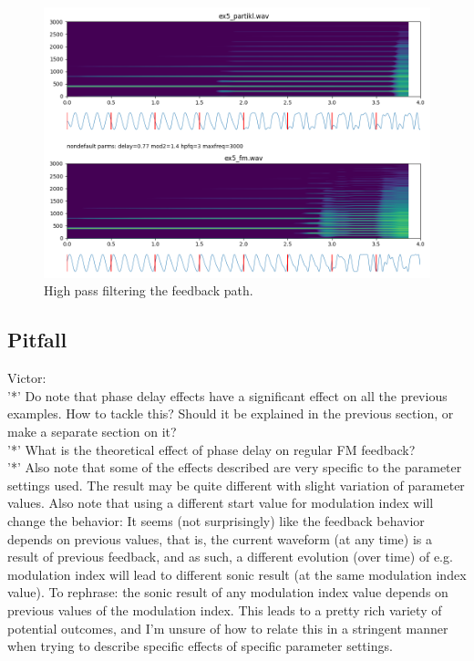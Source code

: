 \documentclass[runningheads,a4paper]{llncs}
\begin{document}
\begin{figure}
	\centering
	\includegraphics[width=.95\textwidth]{ex5_compare.png}
	\caption{High pass filtering the feedback path.}
	\label{fig:ex5}
\end{figure}

\subsection{Pitfall}
Victor: \\
'*' Do note that phase delay effects have a significant effect on all the previous examples. How to tackle this? Should it be explained in the previous section, or make a separate section on it? \\
'*' What is the theoretical effect of phase delay on regular FM feedback? \\
'*' Also note that some of the effects described are very specific to the parameter settings used. The result may be quite different with slight variation of parameter values. Also note that using a different start value for modulation index will change the behavior: It seems (not surprisingly) like the feedback behavior depends on previous values, that is, the current waveform (at any time) is a result of previous feedback, and as such, a different evolution (over time) of e.g. modulation index will lead to different sonic result (at the same modulation index value). To rephrase: the sonic result of any modulation index value depends on previous values of the modulation index. This leads to a pretty rich variety of potential outcomes, and I'm unsure of how to relate this in a stringent manner when trying to describe specific effects of specific parameter settings.
\end{document}
